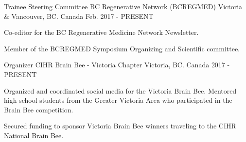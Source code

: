 

\begin{cventries}

  \cventry
    {Trainee Steering Committee} %
    {BC Regenerative Network (BCREGMED)} %
    {Victoria \& Vancouver, BC. Canada} %
    {Feb. 2017 - PRESENT} %
    {
      \begin{cvitems} %
        \item {Co-editor for the BC Regenerative Medicine Network Newsletter.}
        \item {Member of the BCREGMED Symposium Organizing and Scientific committee.}
      \end{cvitems}
    }

  \cventry
    {Organizer} %
    {CIHR Brain Bee - Victoria Chapter} %
    {Victoria, BC. Canada} %
    {2017 - PRESENT} %
    {
      \begin{cvitems} %
        \item {Organized and coordinated social media for the Victoria Brain Bee. Mentored high school students from the Greater Victoria Area who participated in the Brain Bee competition.}
        \item {Secured funding to sponsor Victoria Brain Bee winners traveling to the CIHR National Brain Bee.}
      \end{cvitems}
    }
  

\end{cventries}
